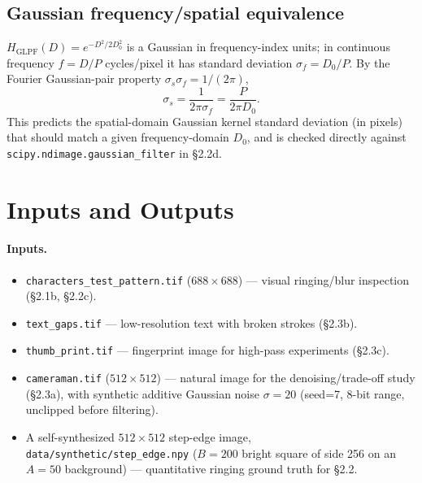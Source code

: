 \documentclass[11pt]{article}
\begin{document}
\subsection{Gaussian frequency/spatial equivalence}

$H_{\text{GLPF}}(D)=e^{-D^2/2D_0^2}$ is a Gaussian in frequency-index units; in continuous
frequency $f=D/P$ cycles/pixel it has standard deviation $\sigma_f = D_0/P$. By the Fourier
Gaussian-pair property $\sigma_s\sigma_f = 1/(2\pi)$,
\begin{equation}
  \sigma_s = \frac{1}{2\pi\sigma_f} = \frac{P}{2\pi D_0}.
\end{equation}
This predicts the spatial-domain Gaussian kernel standard deviation (in pixels) that should match
a given frequency-domain $D_0$, and is checked directly against
\texttt{scipy.ndimage.gaussian\_filter} in \S2.2d.

\section{Inputs and Outputs}

\paragraph{Inputs.}
\begin{itemize}
  \item \texttt{characters\_test\_pattern.tif} ($688\times688$) --- visual ringing/blur inspection
    (\S2.1b, \S2.2c).
  \item \texttt{text\_gaps.tif} --- low-resolution text with broken strokes (\S2.3b).
  \item \texttt{thumb\_print.tif} --- fingerprint image for high-pass experiments (\S2.3c).
  \item \texttt{cameraman.tif} ($512\times512$) --- natural image for the denoising/trade-off study
    (\S2.3a), with synthetic additive Gaussian noise $\sigma=20$ (seed=7, 8-bit range, unclipped
    before filtering).
  \item A self-synthesized $512\times512$ step-edge image, \texttt{data/synthetic/step\_edge.npy}
    ($B=200$ bright square of side 256 on an $A=50$ background) --- quantitative ringing ground
    truth for \S2.2.
\end{itemize}
\end{document}
